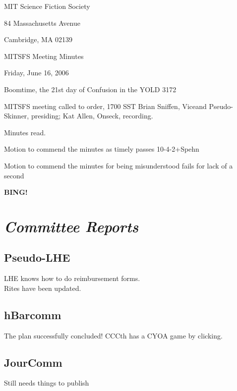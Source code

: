 \documentclass[10pt]{article}
\newcommand{\bing}{{\bf BING!} }
\newcommand{\goto}[1]{\bing \vskip 12pt \section*{{\em{#1}}}}
\begin{document}
\begin{center}

MIT Science Fiction Society

84 Massachusetts Avenue

Cambridge, MA 02139

\vspace{12pt}

MITSFS Meeting Minutes

Friday, June 16, 2006

Boomtime, the 21st day of Confusion in the YOLD 3172

\end{center}

\vspace{18pt}

\setlength{\parskip}{6pt}

\noindent
MITSFS meeting called to order, 1700 SST
Brian Sniffen, Viceand Pseudo-Skinner, presiding; Kat Allen, Onseck, recording.

Minutes read.


Motion to commend the minutes as timely passes 10-4-2+Spehn

Motion to commend the minutes for being misunderstood fails for lack
of a second

\goto{Committee Reports}

\subsection*{Pseudo-LHE}
LHE knows how to do reimbursement forms.\\
Rites have been updated.

\subsection*{hBarcomm}
The plan successfully concluded! 
CCCth has a CYOA game by clicking.



\subsection*{JourComm}
Still needs things to publish
\end{document}
